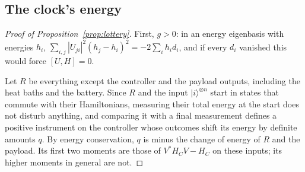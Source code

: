 \documentclass[11pt]{article}
\theoremstyle{definition}
\theoremstyle{remark}
\begin{document}
\subsection{The clock's energy}\label{pf:lottery}

\begin{proof}[Proof of Proposition~\ref{prop:lottery}]
First, $g>0$: in an energy eigenbasis with energies $h_i$, $\sum_{i,j}|U_{ji}|^2(h_j-h_i)^2=-2\sum_ih_id_i$, and if every $d_i$ vanished this would force $[U,H]=0$.

Let $R$ be everything except the controller and the payload outputs, including the heat baths and the battery. Since $R$ and the input $|i\rangle^{\otimes n}$ start in states that commute with their Hamiltonians, measuring their total energy at the start does not disturb anything, and comparing it with a final measurement defines a positive instrument on the controller whose outcomes shift its energy by definite amounts $q$. By energy conservation, $q$ is minus the change of energy of $R$ and the payload. Its first two moments are those of $V^*H_CV-H_C$ on these inputs; its higher moments in general are not.


\end{proof}
\end{document}
